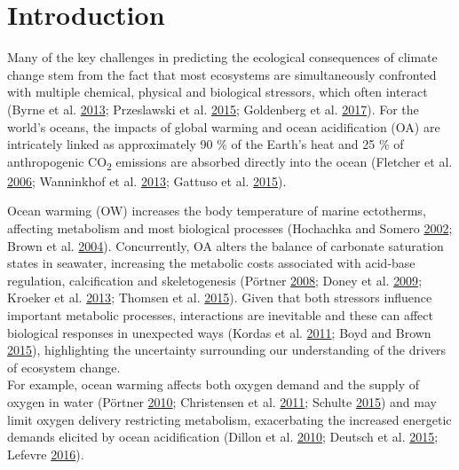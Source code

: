 \documentclass[a4paper,10pt, oneside]{memoir}
\begin{document}
\hypertarget{introduction-1}{%
\section{Introduction}\label{introduction-1}}

Many of the key challenges in predicting the ecological consequences of climate change stem from the fact that most ecosystems are simultaneously confronted with multiple chemical, physical and biological stressors, which often interact (Byrne et al. \protect\hyperlink{ref-Byrne2013}{2013}; Przeslawski et al. \protect\hyperlink{ref-Przeslawski2015}{2015}; Goldenberg et al. \protect\hyperlink{ref-Goldenberg2017}{2017}).
For the world's oceans, the impacts of global warming and ocean acidification (OA) are intricately linked as approximately 90 \% of the Earth's heat and 25 \% of anthropogenic CO\textsubscript{2} emissions are absorbed directly into the ocean (Fletcher et al. \protect\hyperlink{ref-Fletcher2006}{2006}; Wanninkhof et al. \protect\hyperlink{ref-Wanninkhof2013}{2013}; Gattuso et al. \protect\hyperlink{ref-Gattuso2015}{2015}).

Ocean warming (OW) increases the body temperature of marine ectotherms, affecting metabolism and most biological processes (Hochachka and Somero \protect\hyperlink{ref-Hochachka2002}{2002}; Brown et al. \protect\hyperlink{ref-Brown2004}{2004}).
Concurrently, OA alters the balance of carbonate saturation states in seawater, increasing the metabolic costs associated with acid-base regulation, calcification and skeletogenesis (Pörtner \protect\hyperlink{ref-Portner2008}{2008}; Doney et al. \protect\hyperlink{ref-Doney2009}{2009}; Kroeker et al. \protect\hyperlink{ref-Kroeker2013}{2013}; Thomsen et al. \protect\hyperlink{ref-Thomsen2015}{2015}).
Given that both stressors influence important metabolic processes, interactions are inevitable and these can affect biological responses in unexpected ways (Kordas et al. \protect\hyperlink{ref-Kordas2011}{2011}; Boyd and Brown \protect\hyperlink{ref-Boyd2015}{2015}), highlighting the uncertainty surrounding our understanding of the drivers of ecosystem change.\\
For example, ocean warming affects both oxygen demand and the supply of oxygen in water (Pörtner \protect\hyperlink{ref-Portner2010}{2010}; Christensen et al. \protect\hyperlink{ref-Christensen2011}{2011}; Schulte \protect\hyperlink{ref-Schulte2015}{2015}) and may limit oxygen delivery restricting metabolism, exacerbating the increased energetic demands elicited by ocean acidification (Dillon et al. \protect\hyperlink{ref-Dillon2010}{2010}; Deutsch et al. \protect\hyperlink{ref-Deutsch2015}{2015}; Lefevre \protect\hyperlink{ref-Lefevre2016}{2016}).
\end{document}
